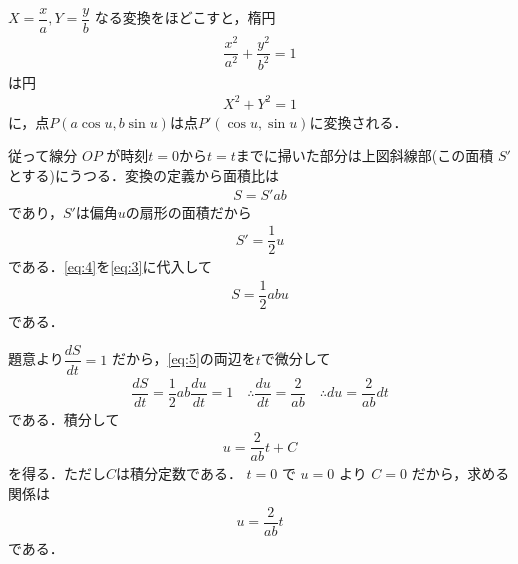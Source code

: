 \documentclass[../../main.tex]{subfiles}
\begin{document}
$X = \dfrac{x}{a}, Y = \dfrac{y}{b}$ なる変換をほどこすと，楕円
\begin{align}
  \dfrac{x^2}{a^2}+\dfrac{y^2}{b^2} = 1 \label{eq:1}
\end{align}
は円
\begin{align}
  X^2 + Y^2 = 1 \label{eq:2}
\end{align}
に，点$P(a\cos u,b\sin u)$は点$P'(\cos u,\sin u)$に変換される．

従って線分 $OP$ が時刻$t=0$から$t=t$までに掃いた部分は上図斜線部(この面積 $S'$ とする)にうつる．変換の定義から面積比は
\begin{align}
  S = S' ab \label{eq:3}
\end{align}
であり，$S'$は偏角$u$の扇形の面積だから
\begin{align}
  S' = \dfrac{1}{2} u \label{eq:4}
\end{align}
である．\cref{eq:4}を\cref{eq:3}に代入して
\begin{align}
  S = \dfrac{1}{2} ab u \label{eq:5}
\end{align}
である．

題意より$\dfrac{dS}{dt} = 1$ だから，\cref{eq:5}の両辺を$t$で微分して
\begin{align}
  \dfrac{dS}{dt} = \dfrac{1}{2} ab \dfrac{du}{dt} = 1
  \quad \therefore
  \dfrac{du}{dt} = \dfrac{2}{ab}
  \quad \therefore
  du = \dfrac{2}{ab} dt
\end{align}
である．積分して
\begin{align}
  u = \dfrac{2}{ab} t + C
\end{align}
を得る．ただし$C$は積分定数である．
$t=0$ で $u=0$ より $C=0$ だから，求める関係は
\begin{align}
  u = \dfrac{2}{ab} t
\end{align}
である．

\newpage
\end{document}
